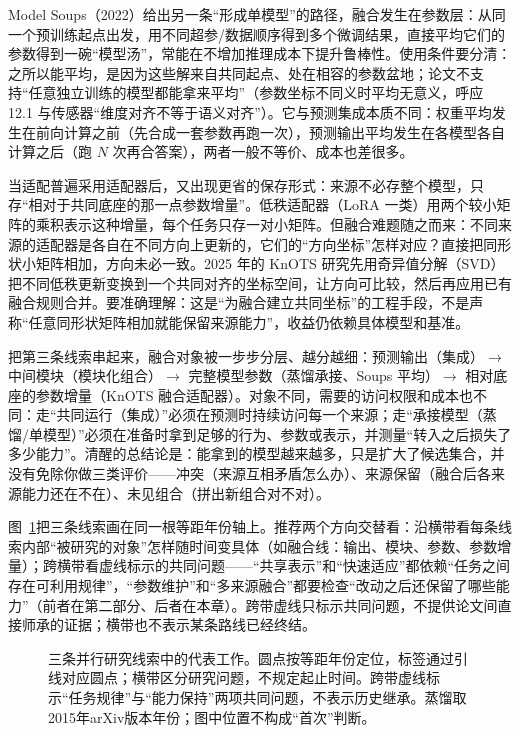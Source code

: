 Model Soups（2022）给出另一条“形成单模型”的路径，融合发生在参数层：从同一个预训练起点出发，用不同超参/数据顺序得到多个微调结果，直接平均它们的参数得到一碗“模型汤”，常能在不增加推理成本下提升鲁棒性。使用条件要分清：之所以能平均，是因为这些解来自共同起点、处在相容的参数盆地；论文不支持“任意独立训练的模型都能拿来平均”（参数坐标不同义时平均无意义，呼应 12.1 与传感器“维度对齐不等于语义对齐”）。它与预测集成本质不同：权重平均发生在前向计算之前（先合成一套参数再跑一次），预测输出平均发生在各模型各自计算之后（跑 $N$ 次再合答案），两者一般不等价、成本也差很多。

当适配普遍采用适配器后，又出现更省的保存形式：来源不必存整个模型，只存“相对于共同底座的那一点参数增量”。低秩适配器（LoRA 一类）用两个较小矩阵的乘积表示这种增量，每个任务只存一对小矩阵。但融合难题随之而来：不同来源的适配器是各自在不同方向上更新的，它们的“方向坐标”怎样对应？直接把同形状小矩阵相加，方向未必一致。2025 年的 KnOTS 研究先用奇异值分解（SVD）把不同低秩更新变换到一个共同对齐的坐标空间，让方向可比较，然后再应用已有融合规则合并。要准确理解：这是“为融合建立共同坐标”的工程手段，不是声称“任意同形状矩阵相加就能保留来源能力”，收益仍依赖具体模型和基准。

把第三条线索串起来，融合对象被一步步分层、越分越细：预测输出（集成）$\to$ 中间模块（模块化组合）$\to$ 完整模型参数（蒸馏承接、Soups 平均）$\to$ 相对底座的参数增量（KnOTS 融合适配器）。对象不同，需要的访问权限和成本也不同：走“共同运行（集成）”必须在预测时持续访问每一个来源；走“承接模型（蒸馏/单模型）”必须在准备时拿到足够的行为、参数或表示，并测量“转入之后损失了多少能力”。清醒的总结论是：能拿到的模型越来越多，只是扩大了候选集合，并没有免除你做三类评价——冲突（来源互相矛盾怎么办）、来源保留（融合后各来源能力还在不在）、未见组合（拼出新组合对不对）。

图~\ref{fig:kts-overview-history}把三条线索画在同一根等距年份轴上。推荐两个方向交替看：沿横带看每条线索内部“被研究的对象”怎样随时间变具体（如融合线：输出、模块、参数、参数增量）；跨横带看虚线标示的共同问题——“共享表示”和“快速适应”都依赖“任务之间存在可利用规律”，“参数维护”和“多来源融合”都要检查“改动之后还保留了哪些能力”（前者在第二部分、后者在本章）。跨带虚线只标示共同问题，不提供论文间直接师承的证据；横带也不表示某条路线已经终结。

\begin{figure}[htbp]
  \centering
  
  \caption{三条并行研究线索中的代表工作。圆点按等距年份定位，标签通过引线对应圆点；横带区分研究问题，不规定起止时间。跨带虚线标示“任务规律”与“能力保持”两项共同问题，不表示历史继承。蒸馏取2015年arXiv版本年份；图中位置不构成“首次”判断。}
  \label{fig:kts-overview-history}
\end{figure}

